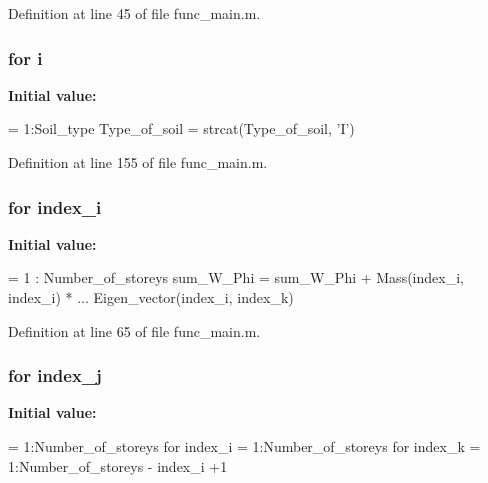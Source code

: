 Definition at line 45 of file func\-\_\-main.\-m.

\subsubsection[{i}]{\setlength{\rightskip}{0pt plus 5cm}for i}\label{func__main_8m_a6f6ccfcf58b31cb6412107d9d5281426}
{\bfseries Initial value\-:}
\begin{DoxyCode}
= 1:Soil\_type
 Type_of_soil = strcat(Type_of_soil, \textcolor{charliteral}{'I'})
\end{DoxyCode}


Definition at line 155 of file func\-\_\-main.\-m.

\subsubsection[{index\-\_\-i}]{\setlength{\rightskip}{0pt plus 5cm}for index\-\_\-i}\label{func__main_8m_ac6e21a32e1cf6d0626600bb610d05c93}
{\bfseries Initial value\-:}
\begin{DoxyCode}
= 1 : Number\_of\_storeys
                                sum\_W\_Phi = sum\_W\_Phi + Mass(index_i, index_i) * ...
                                Eigen\_vector(index_i, index_k)
\end{DoxyCode}


Definition at line 65 of file func\-\_\-main.\-m.

\subsubsection[{index\-\_\-j}]{\setlength{\rightskip}{0pt plus 5cm}for index\-\_\-j}\label{func__main_8m_a9d105c6932d303e9e7a82b49e9bc876a}
{\bfseries Initial value\-:}
\begin{DoxyCode}
= 1:Number\_of\_storeys
                \textcolor{keywordflow}{for} index_i = 1:Number\_of\_storeys
                        \textcolor{keywordflow}{for} index_k = 1:Number\_of\_storeys - index_i +1
\end{DoxyCode}


